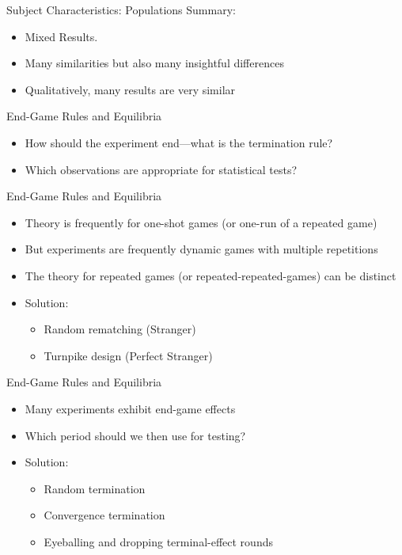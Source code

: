 \documentclass{beamer}
\begin{document}
\begin{frame}{Subject Characteristics: Populations}
Summary:
	\begin{itemize}
		\item Mixed Results.
		\item Many similarities but also many insightful differences
		\item Qualitatively, many results are very similar
	\end{itemize}
\end{frame}

\begin{frame}{End-Game Rules and Equilibria}
	\begin{itemize}
	\item How should the experiment end---what is the termination rule?
	\item Which observations are appropriate for statistical tests?
	\end{itemize}
\end{frame}

\begin{frame}{End-Game Rules and Equilibria}
	\begin{itemize}
		\item Theory is frequently for one-shot games (or one-run of a repeated game)
		\item But experiments are frequently dynamic games with multiple repetitions
		\item The theory for repeated games (or repeated-repeated-games) can be distinct \pause
		\item Solution:
    		\begin{itemize}
    			\item Random rematching (Stranger)
    			\item Turnpike design (Perfect Stranger)
    		\end{itemize}
	\end{itemize}
\end{frame}

\begin{frame}{End-Game Rules and Equilibria}
	\begin{itemize}
		\item Many experiments exhibit end-game effects
		\item Which period should we then use for testing? \pause
		\item Solution:
		\begin{itemize}
			\item Random termination
			\item Convergence termination
			\item Eyeballing and dropping terminal-effect rounds
		\end{itemize}
	\end{itemize}
\end{frame}
\end{document}
